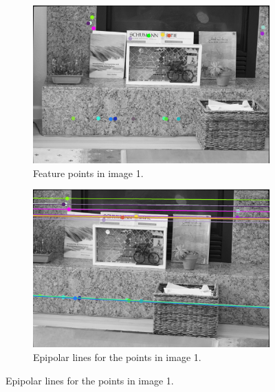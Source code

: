 \documentclass[a4paper]{article}
\begin{document}
\begin{figure}
    \centering
    \begin{subfigure}[b]{0.45\textwidth}
        \includegraphics[width=\textwidth]{../epi2}
        \caption{Feature points in image 1.}
        \label{fig:epi_a}
    \end{subfigure}
    \begin{subfigure}[b]{0.45\textwidth}
        \includegraphics[width=\textwidth]{../epi1}
        \caption{Epipolar lines for the points in image 1.}
        \label{fig:epi_b}
    \end{subfigure}
\end{figure}
\end{document}
